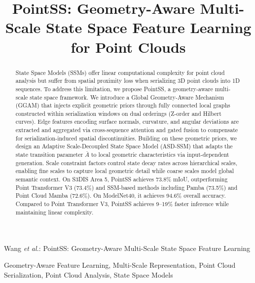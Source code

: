\documentclass[letterpaper,journal]{IEEEtran}
\begin{document}
\title{PointSS: Geometry-Aware Multi-Scale State Space Feature Learning for Point Clouds}

\author{}

%
{Wang \MakeLowercase{\textit{et al.}}: PointSS: Geometry-Aware Multi-Scale State Space Feature Learning}

\maketitle

\begin{abstract}
State Space Models (SSMs) offer linear computational complexity for point cloud analysis but suffer from spatial proximity loss when serializing 3D point clouds into 1D sequences. To address this limitation, we propose PointSS, a geometry-aware multi-scale state space framework. We introduce a Global Geometry-Aware Mechanism (GGAM) that injects explicit geometric priors through fully connected local graphs constructed within serialization windows on dual orderings (Z-order and Hilbert curves). Edge features encoding surface normals, curvature, and angular deviations are extracted and aggregated via cross-sequence attention and gated fusion to compensate for serialization-induced spatial discontinuities. Building on these geometric priors, we design an Adaptive Scale-Decoupled State Space Model (ASD-SSM) that adapts the state transition parameter $\bar{A}$ to local geometric characteristics via input-dependent generation. Scale constraint factors control state decay rates across hierarchical scales, enabling fine scales to capture local geometric detail while coarse scales model global semantic context. On S3DIS Area 5, PointSS achieves 73.8\% mIoU, outperforming Point Transformer V3 (73.4\%) and SSM-based methods including Pamba (73.5\%) and Point Cloud Mamba (72.6\%). On ModelNet40, it achieves 94.6\% overall accuracy. Compared to Point Transformer V3, PointSS achieves 9--19\% faster inference while maintaining linear complexity.
\end{abstract}

\begin{IEEEkeywords}
Geometry-Aware Feature Learning, Multi-Scale Representation, Point Cloud Serialization,  Point Cloud Analysis, State Space Models
\end{IEEEkeywords}
\end{document}
